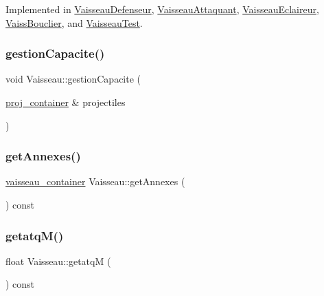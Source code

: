 Implemented in \mbox{\hyperlink{class_vaisseau_defenseur_a9d8301faaaebc09dd5e807e8ebe829ae}{Vaisseau\+Defenseur}}, \mbox{\hyperlink{class_vaisseau_attaquant_aaa30cf9a9cd4319bbf418799019284d7}{Vaisseau\+Attaquant}}, \mbox{\hyperlink{class_vaisseau_eclaireur_a66811ba07fd951304cca1c8be457b8e4}{Vaisseau\+Eclaireur}}, \mbox{\hyperlink{class_vaiss_bouclier_a03ba45dff79711b32db64d01ab7ff90b}{Vaiss\+Bouclier}}, and \mbox{\hyperlink{class_vaisseau_test_a9207fbb193d4395cefbd6977bc502bcb}{Vaisseau\+Test}}.

\mbox{\label{class_vaisseau_ad6127e3a4937ae6644fc7d370386c7b6}} 
\subsubsection{\texorpdfstring{gestion\+Capacite()}{gestionCapacite()}}
{\footnotesize\ttfamily void Vaisseau\+::gestion\+Capacite (\begin{DoxyParamCaption}\item[{\mbox{\hyperlink{def__type_8h_a87980cd8ee9533e561a73e8bbc728188}{proj\+\_\+container}} \&}]{projectiles }\end{DoxyParamCaption})}

\mbox{\label{class_vaisseau_a2ea21b3478208f87754ea41b5809852a}} 
\subsubsection{\texorpdfstring{get\+Annexes()}{getAnnexes()}}
{\footnotesize\ttfamily \mbox{\hyperlink{def__type_8h_ad123ed7c93f42c8dd68e4af28b16b639}{vaisseau\+\_\+container}} Vaisseau\+::get\+Annexes (\begin{DoxyParamCaption}{ }\end{DoxyParamCaption}) const\hspace{0.3cm}{\ttfamily [inline]}}

\mbox{\label{class_vaisseau_a8d069f5d4a224b4c120e07541dbe40d0}} 
\subsubsection{\texorpdfstring{getatq\+M()}{getatqM()}}
{\footnotesize\ttfamily float Vaisseau\+::getatqM (\begin{DoxyParamCaption}{ }\end{DoxyParamCaption}) const\hspace{0.3cm}{\ttfamily [inline]}}

